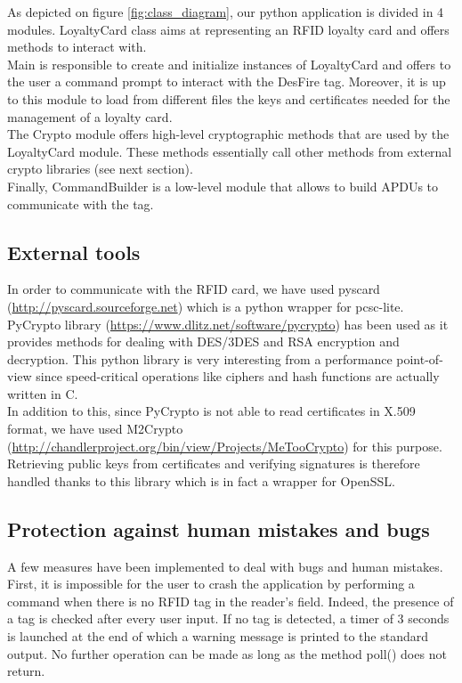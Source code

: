 \documentclass[a4paper,11pt,oneside]{article}
\begin{document}
As depicted on figure \ref{fig:class_diagram}, our python application is divided in 4 modules. LoyaltyCard class aims at representing an RFID loyalty card and offers methods to interact with. \\
Main is responsible to create and initialize instances of LoyaltyCard and offers to the user a command prompt to interact with the DesFire tag. Moreover, it is up to this module to load from different files the keys and certificates needed for the management of a loyalty card. \\
The Crypto module offers high-level cryptographic methods that are used by the LoyaltyCard module. These methods essentially call other methods from external crypto libraries (see next section). \\
Finally, CommandBuilder is a low-level module that allows to build APDUs to communicate with the tag. \\


\subsection{External tools}

In order to communicate with the RFID card, we have used pyscard (\url{http://pyscard.sourceforge.net}) which is a python wrapper for pcsc-lite. \\

PyCrypto library (\url{https://www.dlitz.net/software/pycrypto}) has been used as it provides methods for dealing with DES/3DES and RSA encryption and decryption. This python library is very interesting from a performance point-of-view since speed-critical operations like ciphers and hash functions are actually written in C. \\

In addition to this, since PyCrypto is not able to read certificates in X.509 format, we have used M2Crypto (\url{http://chandlerproject.org/bin/view/Projects/MeTooCrypto}) for this purpose. Retrieving public keys from certificates and verifying signatures is therefore handled thanks to this library which is in fact a wrapper for OpenSSL. \\ 

\subsection{Protection against human mistakes and bugs}

A few measures have been implemented to deal with bugs and human mistakes. First, it is impossible for the user to crash the application by performing a command when there is no RFID tag in the reader's field. Indeed, the presence of a tag is checked after every user input. If no tag is detected, a timer of 3 seconds is launched at the end of which a warning message is printed to the standard output. No further operation can be made as long as the method poll() does not return. \\
\end{document}
